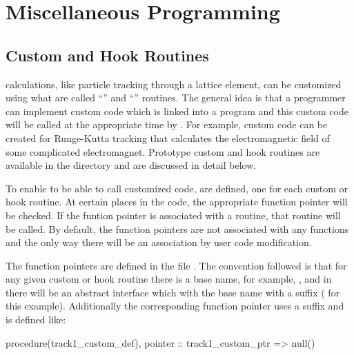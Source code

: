 \chapter{Miscellaneous Programming}

\section{Custom and Hook Routines}
\label{s:custom.hook}

\bmad calculations, like particle tracking through a lattice element, can be customized using what
are called ``'' and ``'' routines. The general idea is that a programmer can
implement custom code which is linked into a program and this custom code will be called at the
appropriate time by \bmad. For example, custom code can be created for Runge-Kutta tracking that
calculates the electromagnetic field of some complicated electromagnet. Prototype custom and hook
routines are available in the  directory and are discussed in detail below.

To enable \bmad to be able to call customized code,  are defined, one for each
custom or hook routine. At certain places in the \bmad code, the appropriate function pointer will
be checked. If the funtion pointer is associated with a routine, that routine will be called. By
default, the function pointers are not associated with any functions and the only way there will be
an association by user code modification.

The function pointers are defined in the file . The
convention followed is that for any given custom or hook routine there is a base name, for example,
, and in  there will be an abstract interface which
with the base name with a  suffix ( for this example). Additionally
the corresponding function pointer uses a  suffix and is defined like:
\begin{example}
  procedure(track1_custom_def), pointer :: track1_custom_ptr => null()
\end{example}

